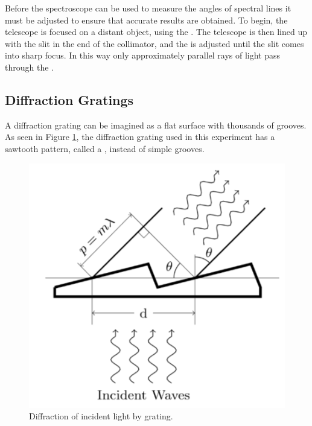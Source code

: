 \documentclass[12pt, a4paper, oneside, openright, titlepage]{book}
\begin{document}
\noindent Before the spectroscope can be used to measure the angles of spectral lines it must be adjusted to ensure that accurate results are obtained. To begin, the telescope is focused on a distant object, using the . The telescope is then lined up with the slit in the end of the collimator, and the  is adjusted until the slit comes into sharp focus. In this way only approximately parallel rays of light pass through the .

\subsection{Diffraction Gratings}

A diffraction grating can be imagined as a flat surface with thousands of grooves. As seen in Figure \ref{fig:SPEC3}, the diffraction grating used in this experiment has a sawtooth pattern, called a , instead of simple grooves.

\begin{figure}[H]
    \centering
    \includegraphics[scale = 0.8]{Images/SPEC3.PNG}
    \caption{Diffraction of incident light by grating.}
    \label{fig:SPEC3}
\end{figure}
\end{document}
